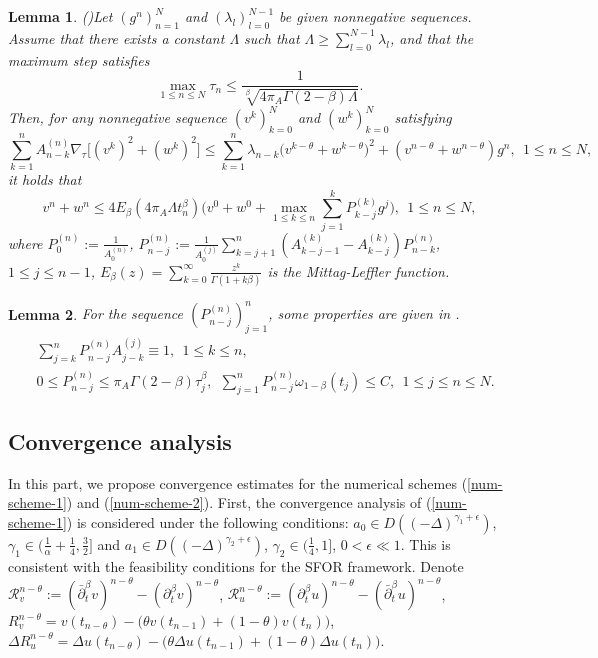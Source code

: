 \documentclass[11pt]{article}
\newtheorem{lemma}{Lemma}[section]
\numberwithin{equation}{section}
\begin{document}
\begin{lemma}\label{grownwall}
(\cite{LyuP2022SFOR})Let $(g^n)_{n=1}^N$ and $(\lambda_l)_{l=0}^{N-1}$ be given nonnegative sequences. Assume that there exists a constant $\Lambda$ such that $\Lambda\geq\sum_{l=0}^{N-1}\lambda_l$, and that the maximum step satisfies
$$\max_{1\leq n \leq N}\tau_n\leq \frac{1}{\sqrt[\beta]{4\pi_A\Gamma{(2-\beta)}\Lambda}}.$$
Then, for any nonnegative sequence $(v^k)_{k=0}^N$ and $(w^k)_{k=0}^N$ satisfying
$$\sum_{k=1}^nA_{n-k}^{(n)}\nabla_\tau\big[(v^k)^2+(w^k)^2\big]\leq\sum_{k=1}^n\lambda_{n-k}\big(v^{k-\theta}+w^{k-\theta}\big)^2+(v^{n-\theta}+w^{n-\theta})g^n,~~1\leq n\leq N,$$
it holds that
$$v^n+w^n\leq 4E_\beta(4\pi_A\Lambda t_n^\beta)\bigg(v^0+w^0+\max_{1\leq k\leq n}\sum_{j=1}^kP_{k-j}^{(k)}g^j\bigg),~~1\leq n\leq N,$$
where $P_0^{(n)}:=\frac{1}{A_0^{(n)}}$, $P_{n-j}^{(n)}:=\frac{1}{A_0^{(j)}}\sum_{k=j+1}^n(A_{k-j-1}^{(k)}-A_{k-j}^{(k)})P_{n-k}^{(n)}$, $1\leq j\leq n-1$, $E_\beta(z)=\sum_{k=0}^\infty\frac{z^k}{\Gamma{(1+k\beta)}}$ is the Mittag-Leffler function.
\end{lemma}

\begin{lemma}\label{P}
For the sequence $(P_{n-j}^{(n)})_{j=1}^n$, some properties are given in \cite{LiaoH2018L1}.
\begin{align*}
&\sum_{j=k}^nP_{n-j}^{(n)}A_{j-k}^{(j)}\equiv1,~~1\leq k\leq n,\\
&0\leq P_{n-j}^{(n)}\leq \pi_A\Gamma{(2-\beta)}\tau_j^\beta,~~\sum_{j=1}^nP_{n-j}^{(n)}\omega_{1-\beta}(t_j)\leq C,~~ 1\leq j\leq n\leq N.
\end{align*}
\end{lemma}


\subsection{Convergence analysis}
In this part, we propose convergence estimates for the numerical schemes (\ref{num-scheme-1}) and (\ref{num-scheme-2}). First, the convergence analysis of (\ref{num-scheme-1}) is considered under the following conditions: $a_0\in D((-\Delta)^{\gamma_1+\epsilon})$, $\gamma_1\in(\frac{1}{\alpha}+\frac{1}{4},\frac32]$ and $a_1\in D((-\Delta)^{\gamma_2+\epsilon})$, $\gamma_2\in(\frac{1}{4},1]$, $0<\epsilon \ll 1$. This is consistent with the feasibility conditions for the SFOR framework. 
Denote $\mathcal{R}_v^{n-\theta}:=(\bar\partial_t^\beta v)^{n-\theta}-(\partial_t^\beta v)^{n-\theta}$, $\mathcal{R}_u^{n-\theta}:=(\partial_t^\beta u)^{n-\theta}-(\bar\partial_t^\beta u)^{n-\theta}$, $R_v^{n-\theta}=v(t_{n-\theta})-\big(\theta v(t_{n-1})+(1-\theta)v(t_n)\big)$, $\Delta R_u^{n-\theta}=\Delta u(t_{n-\theta})-\big(\theta\Delta u(t_{n-1})+(1-\theta)\Delta u(t_n)\big)$.
\end{document}
